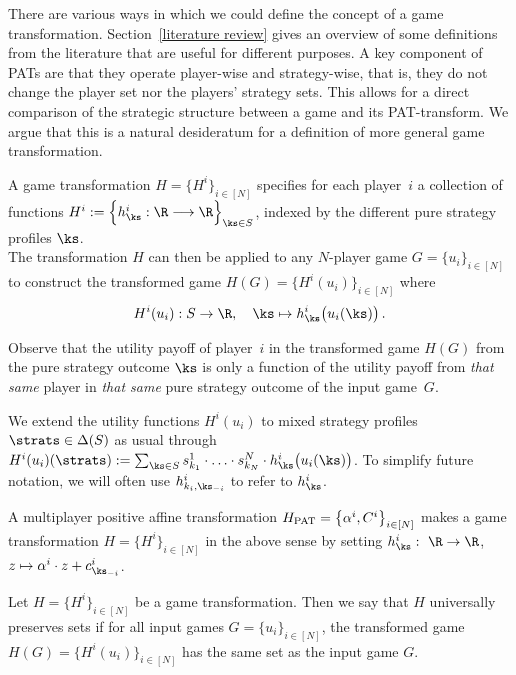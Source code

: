 There are various ways in which we could define the concept of a game transformation. Section~\ref{literature review} gives an overview of some definitions from the literature that are useful for different purposes. A key component of PATs are that they operate player-wise and strategy-wise, that is, they do not change the player set nor the players' strategy sets. This allows for a direct comparison of the strategic structure between a game and its PAT-transform. We argue that this is a natural desideratum for a definition of more general game transformation.

\begin{defn}
\label{def game trafo}
A game transformation $H = \{H^i\}_{i \in [N]}$ specifies for each player~$i$ a collection of functions $H^i := \Big\{ h_{\ks}^i : \R \longrightarrow \R \Big\}_{\ks \in S}$, indexed by the different pure strategy profiles $\ks$. \\
The transformation $H$ can then be applied to any $N$-player game $G = \{u_i\}_{i \in [N]}$ to construct the transformed game $H(G) = \{H^i(u_i)\}_{i \in [N]}$ where 
\begin{align}
\label{transformed pure utilities evaluation}
    H^i(u_i) : S \to \R, \quad \ks \mapsto h_{\ks}^i \big( u_i(\ks) \big) \, .
\end{align}
\end{defn}
Observe that the utility payoff of player~$i$ in the transformed game $H(G)$ from the pure strategy outcome $\ks$ is only a function of the utility payoff from \textit{that same} player in \textit{that same} pure strategy outcome of the input game~$G$.

We extend the utility functions $H^i(u_i)$ to mixed strategy profiles $\strats \in \Delta(S)$ as usual through $H^i(u_i)(\strats) := \sum_{\ks \in S} s_{k_1}^1 \cdot \ldots \cdot s_{k_N}^N \cdot h_{\ks}^i \big( u_i(\ks) \big)$. To simplify future notation, we will often use $h_{k_i,\ks_{-i}}^i$ to refer to $h_{\ks}^i$.

\begin{rem}
A multiplayer positive affine transformation $H_{\textnormal{PAT}} = \big\{ \alpha^i, C^i \big\}_{i \in [N]}$ makes a game transformation $H = \{H^i\}_{i \in [N]}$ in the above sense by setting $h_{\ks}^i : \, \, \R \to \R$, $z \mapsto \alpha^i  \cdot z + c_{\ks_{-i}}^i$.
\end{rem}
\begin{defn}
\label{defn NE preserving}
Let $H = \{H^i\}_{i \in [N]}$ be a game transformation. Then we say that $H$ universally preserves \NE{} sets if for all input games $G = \{u_i\}_{i \in [N]}$, the transformed game $H(G) = \{H^i(u_i)\}_{i \in [N]}$ has the same \NE{} set as the input game $G$.
\end{defn}

